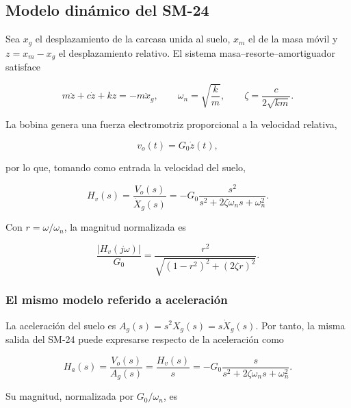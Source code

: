 \subsection{Modelo dinámico del SM-24}

Sea $x_g$ el desplazamiento de la carcasa unida al suelo, $x_m$ el de la masa móvil y
$z=x_m-x_g$ el desplazamiento relativo. El sistema masa--resorte--amortiguador satisface

\begin{equation}
    m\ddot z+c\dot z+kz=-m\ddot x_g,
    \qquad
    \omega_n=\sqrt{\frac{k}{m}},
    \qquad
    \zeta=\frac{c}{2\sqrt{km}}.
    \label{eq:sm24-mecanico}
\end{equation}

La bobina genera una fuerza electromotriz proporcional a la velocidad relativa,

\begin{equation}
    v_o(t)=G_0\dot z(t),
\end{equation}

por lo que, tomando como entrada la velocidad del suelo,

\begin{equation}
    H_v(s)=\frac{V_o(s)}{\dot X_g(s)}
    =-G_0\frac{s^2}{s^2+2\zeta\omega_ns+\omega_n^2}.
    \label{eq:sm24-velocidad}
\end{equation}

Con $r=\omega/\omega_n$, la magnitud normalizada es

\begin{equation}
    \frac{|H_v(j\omega)|}{G_0}
    =\frac{r^2}{\sqrt{(1-r^2)^2+(2\zeta r)^2}}.
    \label{eq:sm24-magnitud}
\end{equation}

\subsubsection{El mismo modelo referido a aceleración}

La aceleración del suelo es $A_g(s)=s^2X_g(s)=s\dot X_g(s)$. Por tanto, la misma salida
del SM-24 puede expresarse respecto de la aceleración como

\begin{equation}
    H_a(s)=\frac{V_o(s)}{A_g(s)}
    =\frac{H_v(s)}{s}
    =-G_0\frac{s}{s^2+2\zeta\omega_ns+\omega_n^2}.
    \label{eq:sm24-aceleracion}
\end{equation}

Su magnitud, normalizada por $G_0/\omega_n$, es

